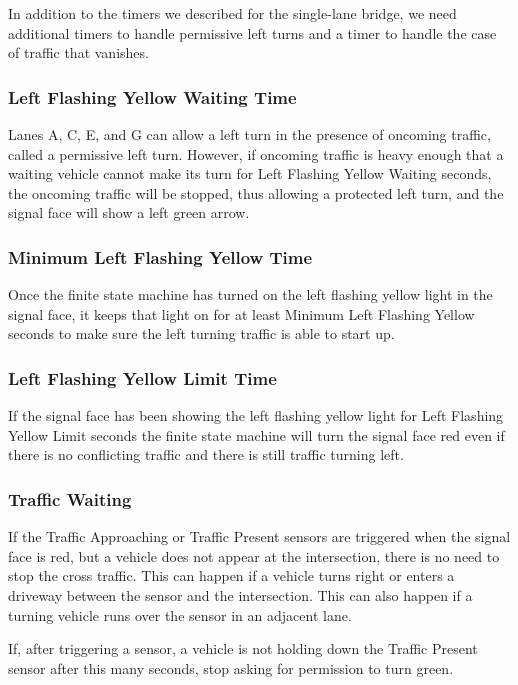 \documentclass[letterpaper,twoside]{article}
\begin{document}
In addition to the timers we described for the single-lane bridge,
we need additional timers to handle permissive left turns and a timer
to handle the case of traffic that vanishes.

\subsubsection{Left Flashing Yellow Waiting Time}

Lanes A, C, E, and G can allow a left turn in the presence of oncoming traffic,
called a permissive left turn. However, if oncoming traffic is heavy enough
that a waiting vehicle cannot make its turn for Left Flashing Yellow Waiting
seconds, the oncoming traffic will be stopped, thus allowing a protected left
turn, and the signal face will show a left green arrow.

\subsubsection{Minimum Left Flashing Yellow Time}

Once the finite state machine has turned on the left flashing yellow light
in the signal face, it keeps that light on for at least Minimum Left Flashing
Yellow seconds to make sure the left turning traffic is able to start up.

\subsubsection{Left Flashing Yellow Limit Time}

If the signal face has been showing the left flashing yellow light for
Left Flashing Yellow Limit seconds the finite state machine will turn
the signal face red even if there is no conflicting traffic and there is
still traffic turning left.

\subsubsection{Traffic Waiting}

If the Traffic Approaching or Traffic Present sensors are triggered
when the signal face is red, but a vehicle does not appear at the
intersection, there is no need to stop the cross traffic.
This can happen if a vehicle turns right or enters a driveway between
the sensor and the intersection.  This can also happen if a turning
vehicle runs over the sensor in an adjacent lane.

If, after triggering a sensor, a vehicle is not holding down the
Traffic Present sensor after this many seconds, stop asking for
permission to turn green.
\end{document}
